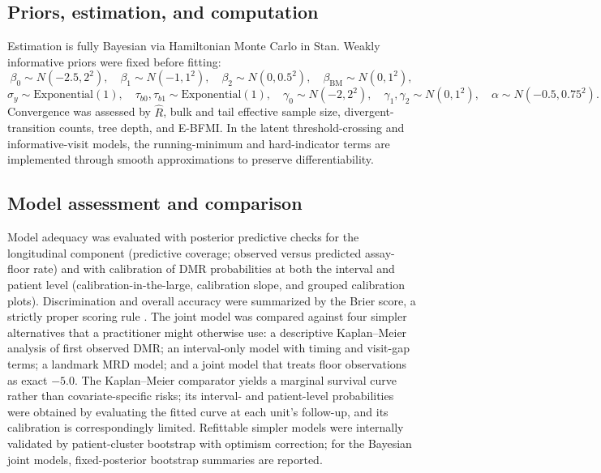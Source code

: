 \documentclass[11pt]{article}
\begin{document}
\subsection{Priors, estimation, and computation}
\label{sec:computation}

Estimation is fully Bayesian via Hamiltonian Monte Carlo in Stan.
Weakly informative priors were fixed before fitting:
\[
\beta_0\sim N(-2.5,2^2),\quad
\beta_1\sim N(-1,1^2),\quad
\beta_2\sim N(0,0.5^2),\quad
\beta_{\mathrm{BM}}\sim N(0,1^2),
\]
\[
\sigma_y\sim \mathrm{Exponential}(1),\quad
\tau_{b0},\tau_{b1}\sim \mathrm{Exponential}(1),\quad
\gamma_0\sim N(-2,2^2),\quad
\gamma_1,\gamma_2\sim N(0,1^2),\quad
\alpha\sim N(-0.5,0.75^2).
\]
Convergence was assessed by $\widehat{R}$, bulk and tail effective sample
size, divergent-transition counts, tree depth, and E-BFMI. In the latent
threshold-crossing and informative-visit models, the running-minimum and
hard-indicator terms are implemented through smooth approximations to
preserve differentiability.

\subsection{Model assessment and comparison}
\label{sec:assessment}

Model adequacy was evaluated with posterior predictive checks for the
longitudinal component (predictive coverage; observed versus predicted
assay-floor rate) and with calibration of DMR probabilities at both the
interval and patient level (calibration-in-the-large, calibration slope,
and grouped calibration plots). Discrimination and overall accuracy were
summarized by the Brier score, a strictly proper scoring rule
\cite{GneitingRaftery2007ProperScoring}. The joint model was compared against four
simpler alternatives that a practitioner might otherwise use: a
descriptive Kaplan--Meier analysis of first observed DMR; an interval-only
model with timing and visit-gap terms; a landmark MRD model; and a joint
model that treats floor observations as exact $-5.0$. The Kaplan--Meier
comparator yields a marginal survival curve rather than covariate-specific
risks; its interval- and patient-level probabilities were obtained by
evaluating the fitted curve at each unit's follow-up, and its calibration is
correspondingly limited. Refittable simpler models were internally validated
by patient-cluster bootstrap with optimism correction; for the Bayesian joint
models, fixed-posterior bootstrap summaries are reported.
\end{document}
